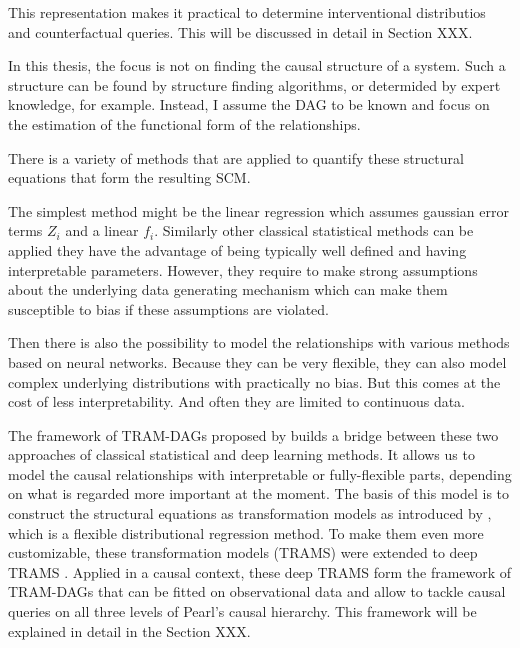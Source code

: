This representation makes it practical to determine interventional distributios and counterfactual queries. This will be discussed in detail in Section XXX.

In this thesis, the focus is not on finding the causal structure of a system. Such a structure can be found by structure finding algorithms, or determided by expert knowledge, for example. Instead, I assume the DAG to be known and focus on the estimation of the functional form of the relationships.

There is a variety of methods that are applied to quantify these structural equations that form the resulting SCM. 

% 


The simplest method might be the linear regression which assumes gaussian error terms $Z_i$ and a linear $f_i$. Similarly other classical statistical methods can be applied they have the advantage of being typically well defined and having interpretable parameters. However, they require to make strong assumptions about the underlying data generating mechanism which can make them susceptible to bias if these assumptions are violated.

Then there is also the possibility to model the relationships with various methods based on neural networks. Because they can be very flexible, they can also model complex underlying distributions with practically no bias. But this comes at the cost of less interpretability. And often they are limited to continuous data.

The framework of TRAM-DAGs proposed by \citet{sick2025} builds a bridge between these two approaches of classical statistical and deep learning methods. It allows us to model the causal relationships with interpretable or fully-flexible parts, depending on what is regarded more important at the moment. The basis of this model is to construct the structural equations as transformation models as introduced by \citet{hothorn2014}, which is a flexible distributional regression method. To make them even more customizable, these transformation models (TRAMS) were extended to deep TRAMS \citep{sick2020}. Applied in a causal context, these deep TRAMS form the framework of TRAM-DAGs that can be fitted on observational data and allow to tackle causal queries on all three levels of Pearl's causal hierarchy. This framework will be explained in detail in the Section XXX.


